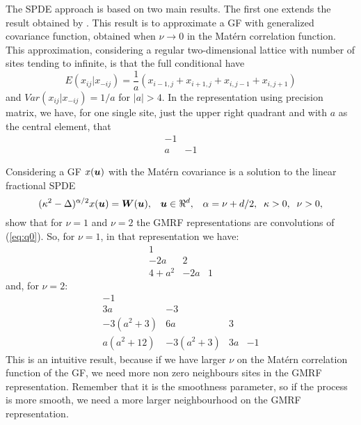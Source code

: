 The SPDE approach is based on two main results. 
The first one extends the result obtained by \cite{besag:1981}. 
This result is to approximate a GF with generalized 
covariance function, obtained when $\nu \rightarrow 0$ 
in the Mat\'ern correlation function. 
This approximation, considering a regular two-dimensional 
lattice with number of sites tending to infinite, 
is that the full conditional have 
\begin{equation}
E(x_{ij}|x_{-ij}) = \frac{1}{a}(x_{i-1,j}+x_{i+1,j}+x_{i,j-1}+x_{i,j+1})
\end{equation}
and $Var(x_{ij}|x_{-ij}) = 1/a$ for $|a|>4$. 
In the representation using precision matrix, 
we have, for one single site, just the upper right 
quadrant and with $a$ as the central element, that 
\begin{equation}\label{eq:q0}
\begin{matrix}
-1  & \\
a & -1
\end{matrix}
\end{equation}

Considering a GF $x(\mbox{\protect \boldmath $u$})$ with the Mat\'ern 
covariance is a solution to the linear fractional SPDE 
\begin{equation}
(\kappa^2 - \Delta )^{\alpha/2}x(\mbox{\protect \boldmath $u$}) = \mbox{\protect \boldmath $W$} (\mbox{\protect \boldmath $u$} ),\;\;\;
\mbox{\protect \boldmath $u$} \in \Re^d,\;\;\;\alpha=\nu+d/2,\;\;\kappa>0,\;\;\nu>0,
\end{equation}
\cite{lindgrenRL:2011} show that for $\nu=1$ and $\nu=2$ 
the GMRF representations are convolutions of (\ref{eq:q0}). 
So, for $\nu=1$, in that representation we have:
\begin{equation}
\begin{matrix}
1  & & \\
-2a & 2 & \\
4+a^2 & -2a & 1
\end{matrix}
\end{equation}\label{eq:q1}
and, for $\nu=2$:
\begin{equation}
\begin{matrix}
-1  & & &\\
3a & -3 & &\\
-3(a^2+3) & 6a & 3 & \\
a(a^2+12) & -3(a^2+3) & 3a & -1
\end{matrix}
\end{equation}\label{eq:q2}
This is an intuitive result, because if we have 
larger $\nu$ on the Mat\'ern correlation function of the GF, 
we need more non zero neighbours sites in the GMRF representation. 
Remember that it is the smoothness parameter, so if the 
process is more smooth, we need a more larger neighbourhood 
on the GMRF representation. 

